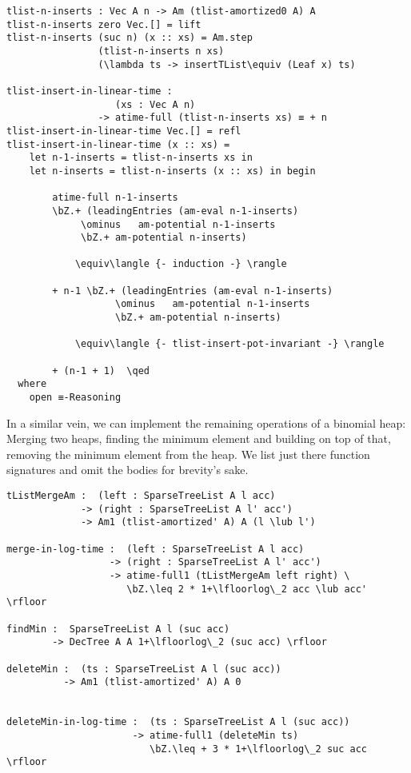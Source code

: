 \begin{lstlisting}[caption={$n$ inserts in linear time},label={lst:binomial:ins-in-linear-time},emph={tlist,insert,inserts,n,in,linear,time,insertTList,am,leadingEntries,potential}]
tlist-n-inserts : Vec A n -> Am (tlist-amortized0 A) A
tlist-n-inserts zero Vec.[] = lift
tlist-n-inserts (suc n) (x :: xs) = Am.step
                (tlist-n-inserts n xs)
                (\lambda ts -> insertTList\equiv (Leaf x) ts)

tlist-insert-in-linear-time :
                   (xs : Vec A n)
                -> atime-full (tlist-n-inserts xs) ≡ + n
tlist-insert-in-linear-time Vec.[] = refl
tlist-insert-in-linear-time (x :: xs) =
    let n-1-inserts = tlist-n-inserts xs in
    let n-inserts = tlist-n-inserts (x :: xs) in begin

        atime-full n-1-inserts
        \bZ.+ (leadingEntries (am-eval n-1-inserts)
             \ominus   am-potential n-1-inserts
             \bZ.+ am-potential n-inserts)

            \equiv\langle {- induction -} \rangle

        + n-1 \bZ.+ (leadingEntries (am-eval n-1-inserts)
                   \ominus   am-potential n-1-inserts
                   \bZ.+ am-potential n-inserts)

            \equiv\langle {- tlist-insert-pot-invariant -} \rangle

        + (n-1 + 1)  \qed
  where
    open ≡-Reasoning
\end{lstlisting}

In a similar vein, we can implement the remaining operations of a binomial heap: Merging two heaps, finding the minimum element and building on top of that, removing the minimum element from the heap. We list just there function signatures and omit the bodies for brevity's sake.

\begin{lstlisting}[caption={Remaining heap operations},label={lst:binomial:remaining},emph={SparseTreeList,tListMergeAm,merge,in,log,time,findMin,deleteMin}]
tListMergeAm :  (left : SparseTreeList A l acc)
             -> (right : SparseTreeList A l' acc')
             -> Am1 (tlist-amortized' A) A (l \lub l')

merge-in-log-time :  (left : SparseTreeList A l acc)
                  -> (right : SparseTreeList A l' acc')
                  -> atime-full1 (tListMergeAm left right) \
                     \bZ.\leq 2 * 1+\lfloorlog\_2 acc \lub acc' \rfloor

findMin :  SparseTreeList A l (suc acc)
        -> DecTree A A 1+\lfloorlog\_2 (suc acc) \rfloor

deleteMin :  (ts : SparseTreeList A l (suc acc))
          -> Am1 (tlist-amortized' A) A 0


deleteMin-in-log-time :  (ts : SparseTreeList A l (suc acc))
                      -> atime-full1 (deleteMin ts)
                         \bZ.\leq + 3 * 1+\lfloorlog\_2 suc acc \rfloor

\end{lstlisting}